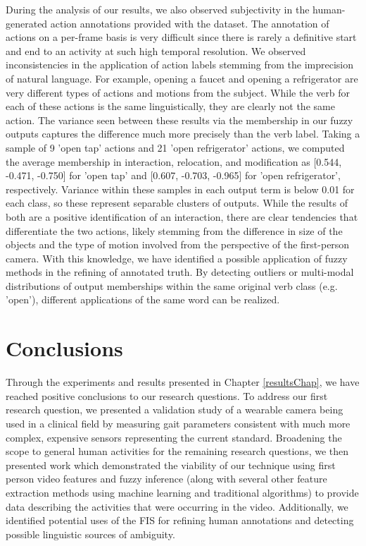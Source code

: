 \documentclass[12pt]{report}
\begin{document}
During the analysis of our results, we also observed subjectivity in the human-generated action annotations provided with the dataset. The annotation of actions on a per-frame basis is very difficult since there is rarely a definitive start and end to an activity at such high temporal resolution. We observed inconsistencies in the application of action labels stemming from the imprecision of natural language. For example, opening a faucet and opening a refrigerator are very different types of actions and motions from the subject. While the verb for each of these actions is the same linguistically, they are clearly not the same action. The variance seen between these results via the membership in our fuzzy outputs captures the difference much more precisely than the verb label. Taking a sample of 9 'open tap' actions and 21 'open refrigerator' actions, we computed the average membership in interaction, relocation, and modification as [0.544, -0.471, -0.750] for 'open tap' and [0.607,	-0.703,	-0.965] for 'open refrigerator', respectively. Variance within these samples in each output term is below 0.01 for each class, so these represent separable clusters of outputs. While the results of both are a positive identification of an interaction, there are clear tendencies that differentiate the two actions, likely stemming from the difference in size of the objects and the type of motion involved from the perspective of the first-person camera. With this knowledge, we have identified a possible application of fuzzy methods in the refining of annotated truth. By detecting outliers or multi-modal distributions of output memberships within the same original verb class (e.g. 'open'), different applications of the same word can be realized.


\chapter{Conclusions}
Through the experiments and results presented in Chapter \ref{resultsChap}, we have reached positive conclusions to our research questions. To address our first research question, we presented a validation study of a wearable camera being used in a clinical field by measuring gait parameters consistent with much more complex, expensive sensors representing the current standard. Broadening the scope to general human activities for the remaining research questions, we then presented work which demonstrated the viability of our technique using first person video features and fuzzy inference (along with several other feature extraction methods using machine learning and traditional algorithms) to provide data describing the activities that were occurring in the video. Additionally, we identified potential uses of the FIS for refining human annotations and detecting possible linguistic sources of ambiguity.
\end{document}

